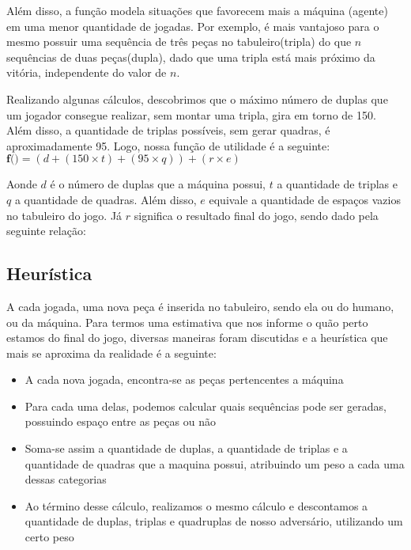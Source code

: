 \documentclass{article}
\begin{document}
      Além disso, a função modela situações que favorecem mais a máquina (agente) em uma menor quantidade de jogadas.
      Por exemplo, é mais vantajoso para o mesmo possuir uma sequência de três peças no tabuleiro(tripla) do que $n$
      sequências de duas peças(dupla), dado que uma tripla está mais próximo da vitória, independente do valor de $n$.
  
      Realizando algunas cálculos, descobrimos que o máximo número de duplas que um jogador consegue realizar, sem
      montar uma tripla, gira em torno de 150. Além disso, a quantidade de triplas possíveis, sem gerar quadras, é
      aproximadamente 95. Logo, nossa função de utilidade é a seguinte:
      \vspace{.5em}
      $\textbf{f()} = (d + (150 \times t) + (95 \times q)) + (r \times e)$
      \vspace{.5em}
  
      Aonde \textbf{$d$} é o número de duplas que a máquina possui, \textbf{$t$} a quantidade de triplas e
      \textbf{$q$} a quantidade de quadras. Além disso, \textbf{$e$} equivale a quantidade de espaços vazios no tabuleiro
      do jogo. Já \textbf{$r$} significa o resultado final do jogo, sendo dado pela seguinte relação:
  
      \vspace{.5em}
      
    \subsection {Heurística}
      A cada jogada, uma nova peça é inserida no tabuleiro, sendo ela ou do humano, ou da máquina. Para termos uma
      estimativa que nos informe o quão perto estamos do final do jogo, diversas maneiras foram discutidas e a
      heurística que mais se aproxima da realidade é a seguinte:
  
      \begin{itemize}
        \item A cada nova jogada, encontra-se as peças pertencentes a máquina
        \item Para cada uma delas, podemos calcular quais sequências pode ser geradas, possuindo espaço entre as peças
        ou não
        \item Soma-se assim a quantidade de duplas, a quantidade de triplas e a quantidade de quadras que a maquina
        possui, atribuindo um peso a cada uma dessas categorias
        \item Ao término desse cálculo, realizamos o mesmo cálculo e descontamos a quantidade de duplas, triplas e
        quadruplas de nosso adversário, utilizando um certo peso
      \end{itemize}
  
\end{document}
